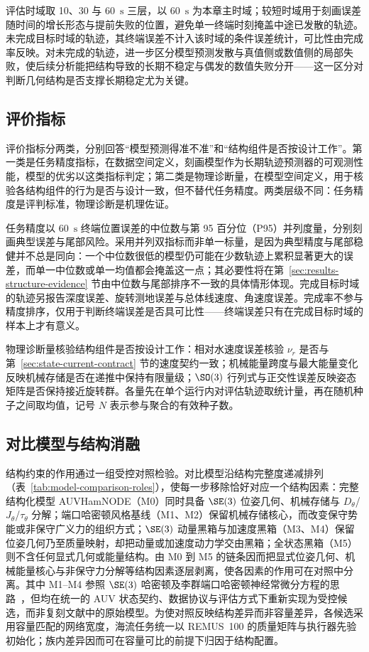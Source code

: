 评估时域取 10、30 与 60~\(\mathrm{s}\) 三层，以 60~\(\mathrm{s}\) 为本章主时域；较短时域用于刻画误差随时间的增长形态与提前失败的位置，避免单一终端时刻掩盖中途已发散的轨迹。未完成目标时域的轨迹，其终端误差不计入该时域的条件误差统计，可比性由完成率反映。对未完成的轨迹，进一步区分模型预测发散与真值侧或数值侧的局部失败，使后续分析能把结构导致的长期不稳定与偶发的数值失败分开——这一区分对判断几何结构是否支撑长期稳定尤为关键。

\subsection{评价指标}
\label{subsec:metrics}

评价指标分两类，分别回答“模型预测得准不准”和“结构组件是否按设计工作”。第一类是任务精度指标，在数据空间定义，刻画模型作为长期轨迹预测器的可观测性能，模型的优劣以这类指标判定；第二类是物理诊断量，在模型空间定义，用于核验各结构组件的行为是否与设计一致，但不替代任务精度。两类层级不同：任务精度是评判标准，物理诊断是机理佐证。

任务精度以 60~\(\mathrm{s}\) 终端位置误差的中位数与第 95 百分位（P95）并列度量，分别刻画典型误差与尾部风险。采用并列双指标而非单一标量，是因为典型精度与尾部稳健并不总是同向：一个中位数很低的模型仍可能在少数轨迹上累积显著更大的误差，而单一中位数或单一均值都会掩盖这一点；其必要性将在第~\ref{sec:results-structure-evidence} 节由中位数与尾部排序不一致的具体情形体现。完成目标时域的轨迹另报告深度误差、旋转测地误差与总体线速度、角速度误差。完成率不参与精度排序，仅用于判断终端误差是否具可比性——终端误差只有在完成目标时域的样本上才有意义。

物理诊断量核验结构组件是否按设计工作：相对水速度误差核验 \(\nu_r\) 是否与第~\ref{sec:state-current-contract} 节的速度契约一致；机械能量跨度与最大能量变化反映机械存储是否在递推中保持有限量级；\(\SO(3)\) 行列式与正交性误差反映姿态矩阵是否保持接近旋转群。各量先在单个运行内对评估轨迹取统计量，再在随机种子之间取均值，记号 \(N\) 表示参与聚合的有效种子数。

\subsection{对比模型与结构消融}
\label{subsec:models-ablations}

结构约束的作用通过一组受控对照检验。对比模型沿结构完整度递减排列（表~\ref{tab:model-comparison-roles}），使每一步移除恰好对应一个结构因素：完整结构化模型 AUVHamNODE（M0）同时具备 \(\SE(3)\) 位姿几何、机械存储与 \(D_\theta\)/\(J_\theta\)/\(\tau_\theta\) 分解；端口哈密顿风格基线（M1、M2）保留机械存储核心，而改变保守势能或非保守广义力的组织方式；\(\SE(3)\) 动量黑箱与加速度黑箱（M3、M4）保留位姿几何乃至质量映射，却把动量或加速度动力学交由黑箱；全状态黑箱（M5）则不含任何显式几何或能量结构。由 M0 到 M5 的链条因而把显式位姿几何、机械能量核心与非保守力分解等结构因素逐层剥离，使各因素的作用可在对照中分离。其中 M1--M4 参照 \(\SE(3)\) 哈密顿及李群端口哈密顿神经常微分方程的思路~\citep{duong2021se3hamnode,duong2024liegroupphnode}，但均在统一的 AUV 状态契约、数据协议与评估方式下重新实现为受控候选，而非复刻文献中的原始模型。为使对照反映结构差异而非容量差异，各候选采用容量匹配的网络宽度，海流任务统一以 REMUS~100 的质量矩阵与执行器先验初始化；族内差异因而可在容量可比的前提下归因于结构配置。

